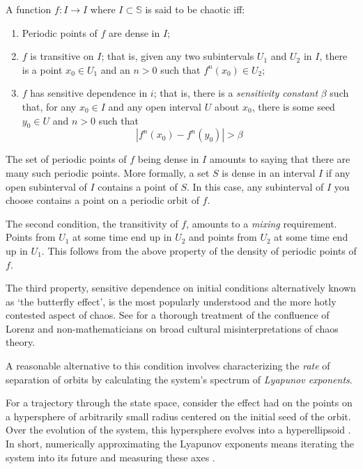 \documentclass[12pt]{article}
\begin{document}
A function $f : I \rightarrow I$ where $I \subset \mathbb{S}$ is said to be
chaotic \cite{hirsch} iff:
\begin{enumerate}
\item Periodic points of $f$ are dense in $I$;
\item $f$ is transitive on $I$;  that is, given any two subintervals $U_{1}$
and $U_{2}$ in $I$, there is a point $x_{0} \in U_{1}$ and an $n > 0$ such
that $f^{n}(x_{0}) \in U_{2}$;
\item $f$ has sensitive dependence in $i$; that is, there is a
\textit{sensitivity constant} $\beta$ such that, for any $x_{0} \in I$ and
any open interval $U$ about $x_{0}$, there is some seed $y_{0} \in U$ and
$n > 0$ such that
$$|f^{n}(x_{0}) - f^{n}(y_{0})| > \beta$$
\end{enumerate}

The set of periodic points of $f$ being dense in $I$ amounts to saying that
there are many such periodic points.  More formally, a set $S$ is dense in
an interval $I$ if any open subinterval of $I$ contains a point of $S$.  In this
case, any subinterval of $I$ you choose contains a point on a periodic orbit of
$f$.

The second condition, the transitivity of $f$, amounts to a \textit{mixing}
requirement.  Points from $U_{1}$ at some time end up in $U_{2}$ and points
from $U_{2}$ at some time end up in $U_{1}$.  This follows from the above
property of the density of periodic points of $f$.

The third property, sensitive dependence on initial conditions alternatively
known as `the butterfly effect', is the most popularly understood and the
more hotly contested aspect of chaos.  See \cite{history} for a thorough
treatment of the
confluence of Lorenz and non-mathematicians on broad cultural
misinterpretations of chaos theory.

A reasonable alternative to this condition involves characterizing
the \textit{rate} of separation of orbits by calculating the system's spectrum of \textit{Lyapunov exponents}.

For a trajectory through the state space, consider the effect had on the
points on a hypersphere of arbitrarily small radius centered on the
initial seed of the orbit.  Over the evolution of the system, this
hypersphere evolves into a hyperellipsoid \cite{alligood, nikilov, verstraeten}.
In short, numerically approximating the Lyapunov exponents means
iterating the system into its future and measuring these axes \cite{sprott}.
\end{document}
